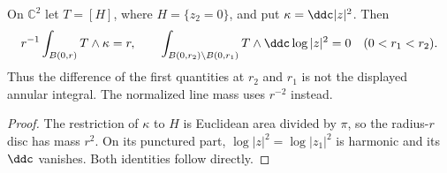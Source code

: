\begin{lemma}\label{lem:radial-exponent-countercheck}
On $\mathbb C^2$ let $T=[H]$, where $H=\{z_2=0\}$, and put $\kappa=\ddc|z|^2$. Then
\[
 r^{-1}\int_{B(0,r)}T\wedge\kappa=r,
 \qquad
 \int_{B(0,r_2)\setminus B(0,r_1)}T\wedge\ddc\log|z|^2=0
 \quad(0<r_1<r_2).
\]
Thus the difference of the first quantities at $r_2$ and $r_1$ is not the displayed annular integral. The normalized line mass uses $r^{-2}$ instead.
\end{lemma}
\begin{proof}
The restriction of $\kappa$ to $H$ is Euclidean area divided by $\pi$, so the radius-$r$ disc has mass $r^2$. On its punctured part, $\log|z|^2=\log|z_1|^2$ is harmonic and its $\ddc$ vanishes. Both identities follow directly.
\end{proof}

